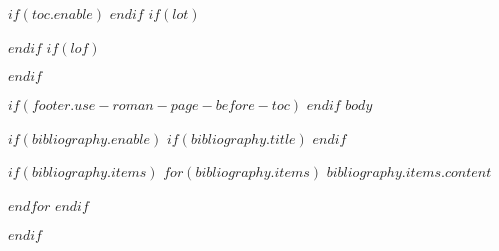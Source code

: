 \documentclass[$if(fontsize)$$fontsize$$else$10pt$endif$, $if(papersize)$$papersize$$else$a4paper$endif$, oneside]{article}
\begin{document}
$if(toc.enable)$
\setcounter{tocdepth}{$if(toc.tocdepth)$$toc.tocdepth$$else$2$endif$}
{ \hypersetup{hidelinks} \tableofcontents } \clearpage
$endif$
$if(lot)$
{ \hypersetup{hidelinks} \listoftables } \clearpage
$endif$
$if(lof)$
{ \hypersetup{hidelinks} \listoffigures } \clearpage
$endif$

$if(footer.use-roman-page-before-toc)$
$endif$
$body$

$if(bibliography.enable)$
$if(bibliography.title)$
\renewcommand\refname{$bibliography.title$}
$endif$
\begin{thebibliography}{9}\label{thebibliography}

$if(bibliography.items)$
$for(bibliography.items)$
$bibliography.items.content$

$endfor$
$endif$
\end{thebibliography}
$endif$

\printindex
\end{document}
